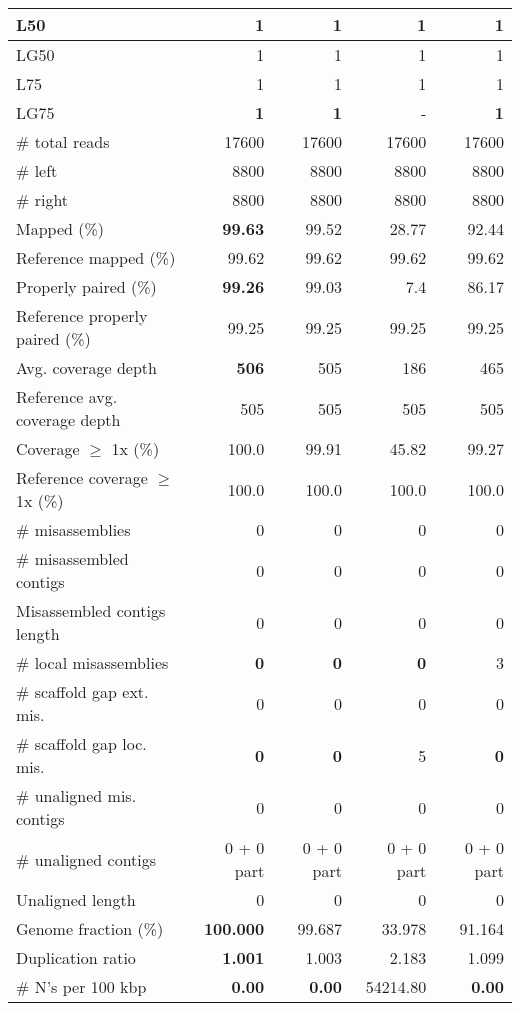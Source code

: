 \documentclass[12pt,a4paper]{article}
\begin{document}
\begin{table}[ht]
\begin{center}
\begin{tabular}{|l*{4}{|r}|}
L50 & 1 & 1 & 1 & 1 \\ \hline
LG50 & 1 & 1 & 1 & 1 \\ \hline
L75 & 1 & 1 & 1 & 1 \\ \hline
LG75 & {\bf 1} & {\bf 1} & - & {\bf 1} \\ \hline
\# total reads & 17600 & 17600 & 17600 & 17600 \\ \hline
\# left & 8800 & 8800 & 8800 & 8800 \\ \hline
\# right & 8800 & 8800 & 8800 & 8800 \\ \hline
Mapped (\%) & {\bf 99.63} & 99.52 & 28.77 & 92.44 \\ \hline
Reference mapped (\%) & 99.62 & 99.62 & 99.62 & 99.62 \\ \hline
Properly paired (\%) & {\bf 99.26} & 99.03 & 7.4 & 86.17 \\ \hline
Reference properly paired (\%) & 99.25 & 99.25 & 99.25 & 99.25 \\ \hline
Avg. coverage depth & {\bf 506} & 505 & 186 & 465 \\ \hline
Reference avg. coverage depth & 505 & 505 & 505 & 505 \\ \hline
Coverage $\geq$ 1x (\%) & 100.0 & 99.91 & 45.82 & 99.27 \\ \hline
Reference coverage $\geq$ 1x (\%) & 100.0 & 100.0 & 100.0 & 100.0 \\ \hline
\# misassemblies & 0 & 0 & 0 & 0 \\ \hline
\# misassembled contigs & 0 & 0 & 0 & 0 \\ \hline
Misassembled contigs length & 0 & 0 & 0 & 0 \\ \hline
\# local misassemblies & {\bf 0} & {\bf 0} & {\bf 0} & 3 \\ \hline
\# scaffold gap ext. mis. & 0 & 0 & 0 & 0 \\ \hline
\# scaffold gap loc. mis. & {\bf 0} & {\bf 0} & 5 & {\bf 0} \\ \hline
\# unaligned mis. contigs & 0 & 0 & 0 & 0 \\ \hline
\# unaligned contigs & 0 + 0 part & 0 + 0 part & 0 + 0 part & 0 + 0 part \\ \hline
Unaligned length & 0 & 0 & 0 & 0 \\ \hline
Genome fraction (\%) & {\bf 100.000} & 99.687 & 33.978 & 91.164 \\ \hline
Duplication ratio & {\bf 1.001} & 1.003 & 2.183 & 1.099 \\ \hline
\# N's per 100 kbp & {\bf 0.00} & {\bf 0.00} & 54214.80 & {\bf 0.00} \\ \hline

\end{tabular}
\end{center}
\end{table}
\end{document}
